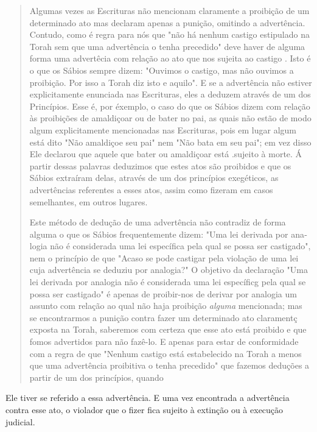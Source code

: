 \begin{quote}
Algumas vezes as Escrituras não mencionam claramente a proibição de um
determinado ato mas declaram apenas a punição, omitindo a advertên­cia.
Contudo, como é regra para nós que "não há nenhum castigo estipulado na
Torah sem que uma advertência o tenha precedido" deve haver de alguma
forma uma advertêcia com relação ao ato que nos sujeita ao castigo .
Isto é o que os Sábios sempre dizem: "Ouvimos o castigo, mas não ouvimos
a proibi­ção. Por isso a Torah diz isto e aquilo". E se a advertência
não estiver explicita­mente enunciada nas Escrituras, eles a deduzem
através de um dos Princípios. Esse é, por éxemplo, o caso do que os
Sábios dizem com relação às proibições de amaldiçoar ou de bater no pai,
as quais não estão de modo algum explicita­mente mencionadas nas
Escrituras, pois em lugar algum está dito "Não amaldi­çoe seu pai" nem
"Não bata em seu pai"; em vez disso Ele declarou que aquele que bater ou
amaldiçoar está .sujeito à morte. Á partir dessas palavras deduzi­mos
que estes atos são proibidos e que os Sábios extraíram delas, através de
um dos princípios exegéticos, as advertências referentes a esses atos,
assim co­mo fizeram em casos semelhantes, em outros lugares.

Este método de dedução de uma advertência não contradiz de for­ma alguma
o que os Sábios frequentemente dizem: "Uma lei derivada por ana­logia
não é considerada uma lei específica pela qual se possa ser castigado",
nem o princípio de que "Acaso se pode castigar pela violação de uma lei
cuja advertência se deduziu por analogia?" O objetivo da declaração "Uma
lei deri­vada por analogia não é considerada uma lei específicg pela
qual se possa ser castigado" é apenas de proibir-nos de derivar por
analogia um assunto com re­lação ao qual não haja proibição
\emph{alguma} mencionada; mas se encontrarmos a punição contra fazer um
determinado ato claramentç exposta na Torah, sabe­remos com certeza que
esse ato está proibido e que fomos advertidos para não fazê-lo. E apenas
para estar de conformidade com a regra de que "Nenhum cas­tigo está
estabelecido na Torah a menos que uma advertência proibitiva o te­nha
precedido" que fazemos deduções a partir de um dos princípios, quando
\end{quote}

Ele tiver se referido a essa advertência. E uma vez encontrada a
advertência contra
esse ato, o violador que o fizer fica sujeito à extinção ou à
execução judicial.

